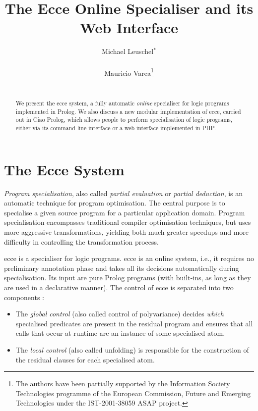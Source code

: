 \documentclass{sig-alternate}
\title{The Ecce Online Specialiser and its Web Interface}
\author{
\alignauthor Michael Leuschel$^*$\\
       \affaddr{University of D\"{u}sseldorf, Germany}\\
       \email{leuschel@cs.uni-duesseldorf.de}
\alignauthor Mauricio Varea\thanks{The authors have been partially supported by the Information Society Technologies programme of the European Commission, Future and Emerging Technologies under the IST-2001-38059 ASAP project.}\\
       \affaddr{University of Southampton, United Kingdom}\\
       \email{m.varea@ecs.soton.ac.uk}
}
\date{}
\begin{document}
\maketitle

\begin{abstract}
We present the {\sc ecce} system, a fully automatic {\em online} specialiser for logic
programs implemented in Prolog.
We also discuss a new modular implementation of {\sc ecce}, carried out in Ciao Prolog, 
which allows people to perform specialisation of logic programs, either via its command-line interface or a web interface implemented in PHP.
\end{abstract}


\section{The Ecce System}

{\em Program specialisation}, also called
 {\em partial evaluation\/} or
 {\em partial deduction},
  is an automatic technique for program optimisation.
The central purpose is to specialise a given source program
 for a particular application domain.
Program specialisation encompasses traditional
 compiler
 optimisation techniques,
 but uses more aggressive
 transformations, yielding both much
 greater speedups and more difficulty in
 controlling the transformation process.

{\sc ecce} is a specialiser for logic programs.
{\sc ecce} is an online system, i.e., it requires no preliminary
 annotation phase and takes all its decisions automatically during
 specialisation.
  Its  input are
 pure Prolog programs (with built-ins, as long as they are used in a declarative
  manner).
The control of  {\sc ecce} is
  separated  into two components \cite{MartensGallagher:ICLP95}:

\begin{itemize}
\item The {\em global control\/} (also called control of polyvariance)
  decides {\em which\/} specialised predicates are present in
   the residual program and ensures that all calls that occur at runtime
   are an instance of some specialised atom.
\item The {\em local control\/} (also called unfolding) is responsible for the
 construction of  the residual clauses for each specialised atom.
\end{itemize}
\end{document}
